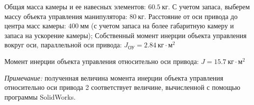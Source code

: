 Общая масса камеры и ее навесных элементов: $60.5 ~\text{кг}$. С учетом запаса, выберем
массу объекта управления манипулятора: $80 ~\text{кг}$.
Расстояние от оси привода до центра масс камеры: $400 ~\text{мм}$ (с учетом запаса
на более габаритную камеру и запаса на ускорение камеры);
Собственный момент инерции объекта управления вокруг оси, параллельной оси привода:
$ J_{\text{ОУ}} = 2.84 ~\text{кг} \cdot \text{м}^2 $

Момент инерции объекта управления относительно оси привода:
$ J = 15.7 ~\text{кг} \cdot \text{м}^2 $

\textit{Примечание:} полученная величина момента инерции объекта управления относительно оси привода 2 соответствует величине, вычисленной с помощью программы SolidWorks.




\endinput

